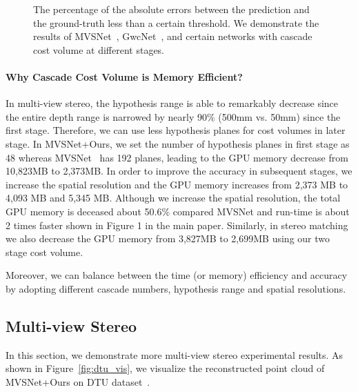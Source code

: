 \documentclass[10pt,twocolumn,letterpaper]{article}
\begin{document}
\begin{figure*}[t!]
\begin{center}
\def\col_k{0.44}
\end{center}
\vspace{-4mm}
 \caption{The percentage of the absolute errors between the prediction and the ground-truth less than a certain threshold.
We demonstrate the results of MVSNet~\cite{yao2018mvsnet}, GwcNet~\cite{guo2019group}, and certain networks with cascade cost volume at different stages.}
\label{fig:hypothesisrange}
\vspace{-4mm}
\end{figure*}

\vspace{-2mm}

\paragraph{Why Cascade Cost Volume is Memory Efficient?}

In multi-view stereo, the hypothesis range is able to remarkably decrease since the entire depth range is narrowed by nearly 90\% (500mm vs. 50mm) since the first stage. Therefore, we can use less hypothesis planes for cost volumes in later stage. In MVSNet+Ours, we set the number of hypothesis planes in first stage as 48 whereas MVSNet~\cite{yao2018mvsnet} has 192 planes, leading to the GPU memory decrease from 10,823MB to 2,373MB. In order to improve the accuracy in subsequent stages, we increase the spatial resolution and the GPU memory increases from 2,373 MB to 4,093 MB and 5,345 MB. Although we increase the spatial resolution, the total GPU memory is deceased about 50.6\% compared MVSNet and run-time is about 2 times faster shown in Figure 1 in the main paper. Similarly, in stereo matching we also decrease the GPU memory from 3,827MB to 2,699MB using our two stage cost volume.

Moreover, we can balance between the time (or memory) efficiency and accuracy by adopting different cascade numbers, hypothesis range and spatial resolutions. 


\subsection{Multi-view Stereo}
In this section, we demonstrate more multi-view stereo experimental results.
As shown in Figure~\ref{fig:dtu_vis}, we visualize the reconstructed point cloud of MVSNet+Ours on DTU dataset~\cite{aanaes2016dtu}.
\end{document}
